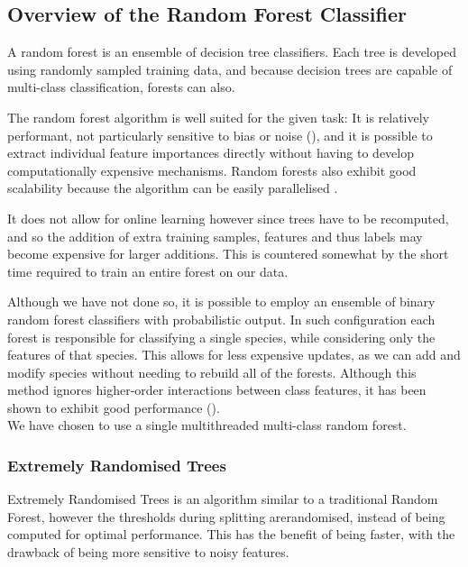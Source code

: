 \subsection{Overview of the Random Forest Classifier}
A random forest \parencite{breiman2001} is an ensemble of decision tree classifiers.
Each tree is developed using randomly sampled training data, and because decision
trees are capable of multi-class classification, forests can also.

The random forest algorithm is well suited for the given task:
It is relatively performant, not particularly sensitive to bias or noise
(\textcite{marko2004}),
and it is possible to extract individual feature importances directly without
having to develop computationally expensive mechanisms.
Random forests also exhibit good scalability because the algorithm can be easily
parallelised \parencite{breiman2001}.

It does not allow for online learning however since trees have to be recomputed, 
and so the addition of extra training samples, features and thus labels may
become expensive for larger additions.
This is countered somewhat by the short time required to train an entire forest
on our data.

Although we have not done so, it is possible to employ an ensemble of binary
random forest classifiers with probabilistic output.
In such configuration each forest is responsible for classifying a single
species, while considering only the features of that species.
This allows for less expensive updates, as we can add and modify species without
needing to rebuild all of the forests.
Although this method ignores higher-order interactions between class features,
it has been shown to exhibit good performance (\textcite{lasseck2013}).\\

We have chosen to use a single multithreaded multi-class random forest.


\subsubsection{Extremely Randomised Trees}
Extremely Randomised Trees \parencite{geurt2006} is an algorithm similar to a
traditional Random Forest, however the thresholds during splitting arerandomised,
instead of being computed for optimal performance.
This has the benefit of being faster, with the drawback of being more sensitive
to noisy features.\\

